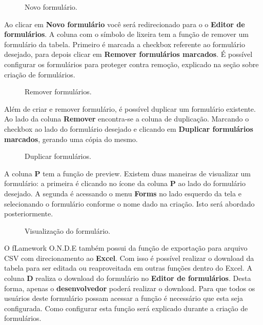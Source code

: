 \documentclass[9pt]{report}
\begin{document}
{    \begin{figure}[H]
      \caption{Novo formulário.}
      \label{fig:novoform}
    \end{figure}

    Ao clicar em \textbf{Novo formulário} você será redirecionado
    para o o \textbf{Editor de formulários}. A coluna com o símbolo
    de lixeira tem a função de remover um formulário da tabela.
    Primeiro é marcada a checkbox referente ao formulário desejado,
    para depois clicar em \textbf{Remover formulários marcados}.
    É possível configurar os formulários para proteger contra
    remoção, explicado na seção sobre criação de formulários.

    \begin{figure}[H]
      \caption{Remover formulários.}
      \label{fig:removerform}
    \end{figure}

    Além de criar e remover formulário, é possível  duplicar um
    formulário existente. Ao lado da coluna \textbf{Remover}
    encontra-se a coluna de duplicação. Marcando o checkbox ao lado
    do formulário desejado e clicando em
    \textbf{Duplicar formulários marcados}, gerando uma cópia do
    mesmo.
    
    \begin{figure}[H]
      \caption{Duplicar formulários.}
      \label{fig:duplicarform}
    \end{figure}
    
    A coluna \textbf{P} tem a função de preview. Existem duas
    maneiras de visualizar um formulário: a primeira é clicando no
    ícone da coluna \textbf{P} ao lado do formulário desejado. A
    segunda é acessando o menu \textbf{Forms} no lado esquerdo da
    tela e selecionando o formulário conforme o nome dado na criação.
    Isto será abordado posteriormente.
    
    \begin{figure}[H]
      \caption{Visualização do formulário.}
      \label{fig:preview}
    \end{figure}

    O fLamework O.N.D.E também possui da função de exportação para
    arquivo CSV com direcionamento ao \textbf{Excel}. Com isso é
    possível realizar o download da tabela para ser editada ou
    reaproveitada em outras funções dentro do Excel. A coluna
    \textbf{D} realiza o download do formulário no
    \textbf{Editor de formulários}. Desta forma, apenas o
    \textbf{desenvolvedor} poderá realizar o download. Para que todos
    os usuários deste formulário possam acessar a função é necessário
    que esta seja configurada. Como configurar esta função será
    explicado durante a criação de formulários.

}
\end{document}
